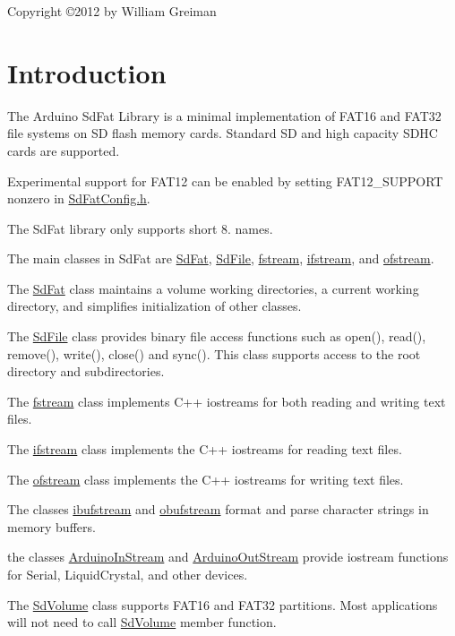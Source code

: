\begin{center}Copyright \copyright 2012 by William Greiman \end{center} \hypertarget{index_Intro}{}\section{Introduction}\label{index_Intro}
The Arduino Sd\-Fat Library is a minimal implementation of F\-A\-T16 and F\-A\-T32 file systems on S\-D flash memory cards. Standard S\-D and high capacity S\-D\-H\-C cards are supported.

Experimental support for F\-A\-T12 can be enabled by setting F\-A\-T12\-\_\-\-S\-U\-P\-P\-O\-R\-T nonzero in \hyperlink{_sd_fat_config_8h}{Sd\-Fat\-Config.\-h}.

The Sd\-Fat library only supports short 8. names.

The main classes in Sd\-Fat are \hyperlink{class_sd_fat}{Sd\-Fat}, \hyperlink{class_sd_file}{Sd\-File}, \hyperlink{classfstream}{fstream}, \hyperlink{classifstream}{ifstream}, and \hyperlink{classofstream}{ofstream}.

The \hyperlink{class_sd_fat}{Sd\-Fat} class maintains a volume working directories, a current working directory, and simplifies initialization of other classes.

The \hyperlink{class_sd_file}{Sd\-File} class provides binary file access functions such as open(), read(), remove(), write(), close() and sync(). This class supports access to the root directory and subdirectories.

The \hyperlink{classfstream}{fstream} class implements C++ iostreams for both reading and writing text files.

The \hyperlink{classifstream}{ifstream} class implements the C++ iostreams for reading text files.

The \hyperlink{classofstream}{ofstream} class implements the C++ iostreams for writing text files.

The classes \hyperlink{classibufstream}{ibufstream} and \hyperlink{classobufstream}{obufstream} format and parse character strings in memory buffers.

the classes \hyperlink{class_arduino_in_stream}{Arduino\-In\-Stream} and \hyperlink{class_arduino_out_stream}{Arduino\-Out\-Stream} provide iostream functions for Serial, Liquid\-Crystal, and other devices.

The \hyperlink{class_sd_volume}{Sd\-Volume} class supports F\-A\-T16 and F\-A\-T32 partitions. Most applications will not need to call \hyperlink{class_sd_volume}{Sd\-Volume} member function.

